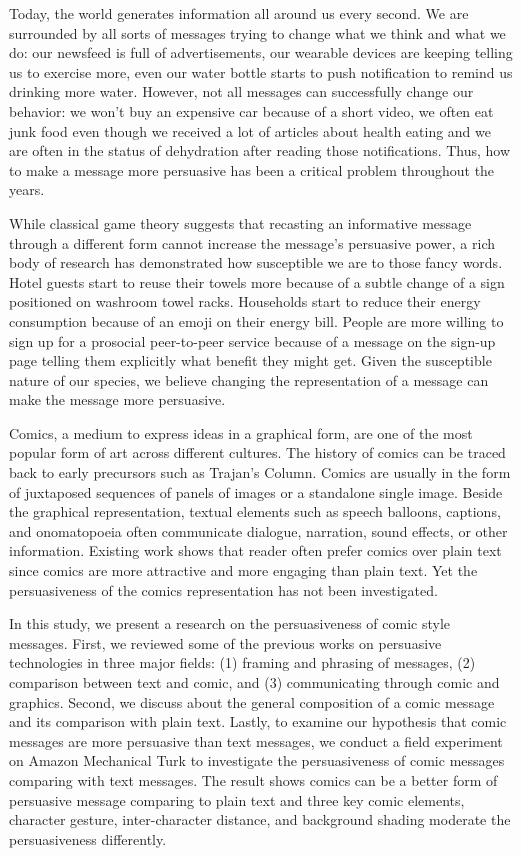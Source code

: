 Today, the world generates information all around us every second. We are surrounded by all sorts of messages trying to change what we think and what we do: our newsfeed is full of advertisements, our wearable devices are keeping telling us to exercise more, even our water bottle starts to push notification to remind us drinking more water. However, not all messages can successfully change our behavior: we won't buy an expensive car because of a short video, we often eat junk food even though we received a lot of articles about health eating and we are often in the status of dehydration after reading those notifications. Thus, how to make a message more persuasive has been a critical problem throughout the years.\par
While classical game theory suggests that recasting an informative message through a different form cannot increase the message's persuasive power, a rich body of research has demonstrated how susceptible we are to those fancy words. Hotel guests start to reuse their towels more because of a subtle change of a sign positioned on washroom towel racks. Households start to reduce their energy consumption because of an emoji on their energy bill. People are more willing to sign up for a prosocial peer-to-peer service because of a message on the sign-up page telling them explicitly what benefit they might get. Given the susceptible nature of our species, we believe changing the representation of a message can make the message more persuasive.\par
Comics, a medium to express ideas in a graphical form, are one of the most popular form of art across different cultures. The history of comics can be traced back to early precursors such as Trajan's Column. Comics are usually in the form of juxtaposed sequences of panels of images or a standalone single image. Beside the graphical representation, textual elements such as speech balloons, captions, and onomatopoeia often communicate dialogue, narration, sound effects, or other information. Existing work shows that reader often prefer comics over plain text since comics are more attractive and more engaging than plain text. Yet the persuasiveness of the comics representation has not been investigated.\par
In this study, we present a research on the persuasiveness of comic style messages. First, we reviewed some of the previous works on persuasive technologies in three major fields: (1) framing and phrasing of messages, (2) comparison between text and comic, and (3) communicating through comic and graphics. Second, we discuss about the general composition of a comic message and its comparison with plain text. Lastly, to examine our hypothesis that comic messages are more persuasive than text messages, we conduct a field experiment on Amazon Mechanical Turk to investigate the persuasiveness of comic messages comparing with text messages. The result shows comics can be a better form of persuasive message comparing to plain text and three key comic elements, character gesture, inter-character distance, and background shading moderate the persuasiveness differently.\par
